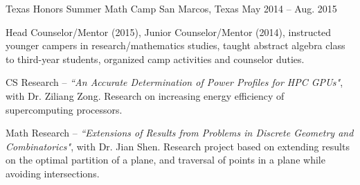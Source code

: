 \begin{cventries}
    {Texas Honors Summer Math Camp}
    {San Marcos, Texas}
    {May 2014 -- Aug. 2015}
    {
      \begin{cvitems}
        \item {Head Counselor/Mentor (2015), Junior Counselor/Mentor (2014), instructed younger campers in research/mathematics studies, taught abstract algebra class to third-year students, organized camp activities and counselor duties.}
        \item {CS Research -- \emph{``An Accurate Determination of Power Profiles for HPC GPUs"}, with Dr. Ziliang Zong. Research on increasing energy efficiency of supercomputing processors.}
        \item {Math Research -- \emph{``Extensions of Results from Problems in Discrete Geometry and Combinatorics"}, with Dr. Jian Shen. Research project based on extending results on the optimal partition of a plane, and traversal of points in a plane while avoiding intersections.}
      \end{cvitems} 
    }
\end{cventries}
